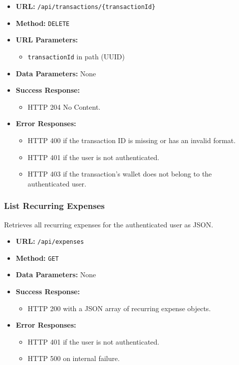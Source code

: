 \begin{itemize}
    \item \textbf{URL:} \texttt{/api/transactions/\{transactionId\}}
    \item \textbf{Method:} \texttt{DELETE}
    \item \textbf{URL Parameters:}
    \begin{itemize}
        \item \texttt{transactionId} in path (UUID)
    \end{itemize}
    \item \textbf{Data Parameters:} None
    \item \textbf{Success Response:}
    \begin{itemize}
        \item HTTP 204 No Content.
    \end{itemize}
    \item \textbf{Error Responses:}
    \begin{itemize}
        \item HTTP 400 if the transaction ID is missing or has an invalid format.
        \item HTTP 401 if the user is not authenticated.
        \item HTTP 403 if the transaction's wallet does not belong to the authenticated user.
    \end{itemize}
\end{itemize}


\subsubsection{List Recurring Expenses}

Retrieves all recurring expenses for the authenticated user as JSON.

\begin{itemize}
    \item \textbf{URL:} \texttt{/api/expenses}
    \item \textbf{Method:} \texttt{GET}
    \item \textbf{Data Parameters:} None
    \item \textbf{Success Response:}
    \begin{itemize}
        \item HTTP 200 with a JSON array of recurring expense objects.
    \end{itemize}
    \item \textbf{Error Responses:}
    \begin{itemize}
        \item HTTP 401 if the user is not authenticated.
        \item HTTP 500 on internal failure.
    \end{itemize}
\end{itemize}

